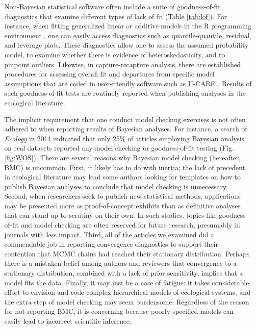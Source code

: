 \documentclass[12pt,english]{article}
\begin{document}
\begin{spacing}{1.9}
Non-Bayesian statistical software often include a suite of
goodness-of-fit diagnostics that examine different types of lack of
fit (Table \ref{tab:lof}).  For instance, when fitting generalized
linear \citep{McCullaghNelder1989} or additive \citep{Wood2006} models
in the R programming environment \citep{RTeam2017}, one can easily
access diagnostics such as quantile-quantile, residual, and leverage
plots.  These diagnostics allow one to assess the assumed probability
model, to examine whether there is evidence of heteroskedasticity, and
to pinpoint outliers.  Likewise, in capture-recapture analysis, there
are established procedures for assessing overall fit and departures
from specific model assumptions that are coded in user-friendly
software such as U-CARE \citep{ChoquetEtAl2009}.  Results of such
goodness-of-fit tests are routinely reported when publishing analyses
in the ecological literature.

The implicit requirement that one conduct model checking exercises is
not often adhered to when reporting results of Bayesian analyses.  For
instance, a search of \textit{Ecology} in 2014 indicated that only
25\% of articles employing Bayesian analysis on real datasets reported
any model checking or goodness-of-fit testing (Fig. \ref{fig:WOS}).
There are several reasons why Bayesian model checking (hereafter, BMC)
is uncommon.  First, it likely has to do with inertia; the lack of
precedent in ecological literature may lead some authors looking for
templates on how to publish Bayesian analyses to conclude that model
checking is unnecessary.  Second, when researchers seek to publish new
statistical methods, applications may be presented more as
proof-of-concept exhibits than as definitive analyses that can stand
up to scrutiny on their own. In such studies, topics like
goodness-of-fit and model checking are often reserved for future
research, presumably in journals with less impact.  Third, all of the
articles we examined did a commendable job in reporting convergence
diagnostics to support their contention that MCMC chains had reached
their stationary distribution.  Perhaps there is a mistaken belief
among authors and reviewers that convergence to a stationary
distribution, combined with a lack of prior sensitivity, implies that
a model fits the data.  Finally, it may just be a case of fatigue: it
takes considerable effort to envision and code complex hierarchical
models of ecological systems, and the extra step of model checking may
seem burdensome.  Regardless of the reason for not reporting BMC, it is
concerning because poorly specified models can easily lead to incorrect scientific inference.


\end{spacing}
\end{document}
